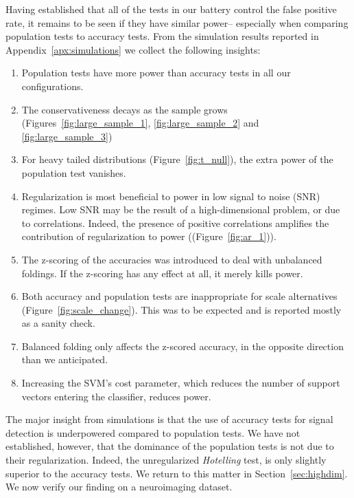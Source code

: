\documentclass[12pt,a4paper]{article}
\theoremstyle{definition}
\begin{document}
Having established that all of the tests in our battery control the false positive rate, it remains to be seen if they have similar power-- 
especially when comparing population tests to accuracy tests. 
From the simulation results reported in Appendix~\ref{apx:simulations} we collect the following insights:
\begin{enumerate}
\item Population tests have more power than accuracy tests in all our configurations.

\item The conservativeness decays as the sample grows (Figures~\ref{fig:large_sample_1}, \ref{fig:large_sample_2} and \ref{fig:large_sample_3})

\item For heavy tailed distributions (Figure~\ref{fig:t_null}), the extra power of the population test vanishes. 

\item Regularization is most beneficial to power in low signal to noise (SNR) regimes. 
Low SNR may be the result of a high-dimensional problem, or due to correlations.
Indeed, the presence of positive correlations amplifies the contribution of regularization to power ((Figure~\ref{fig:ar_1})). 

\item The z-scoring of the accuracies was introduced to deal with unbalanced foldings. 
If the z-scoring has any effect at all, it merely kills power.

\item Both accuracy and population tests are inappropriate for scale alternatives (Figure~\ref{fig:scale_change}). 
This was to be expected and is reported mostly as a sanity check.

\item Balanced folding only affects the z-scored accuracy, in the opposite direction than we anticipated. 

\item Increasing the SVM's cost parameter, which reduces the number of support vectors entering the classifier, reduces power. 

\end{enumerate}


The major insight from simulations is that the use of accuracy tests for signal detection is underpowered compared to population tests. 
We have not established, however, that the dominance of the population tests is not due to their regularization. Indeed, the unregularized \emph{Hotelling} test, is only slightly superior to the accuracy tests. We return to this matter in Section~\ref{sec:highdim}.
We now verify our finding on a neuroimaging dataset.
\end{document}
